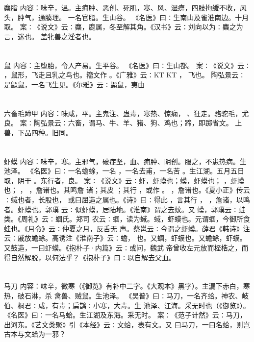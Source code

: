 \documentclass[12pt,UTF8]{ctexbook}
\begin{document}
\chapter{}麋脂
内容：味辛，温。主痈肿、恶创、死肌，寒、风、湿痹，四肢拘缓不收，风头，肿气，通腠理。 
一名官脂。生山谷。 
《名医》曰∶生南山及雀淮南边。十月取。 
案∶《说文》云∶麋，鹿属，冬至解其角。《汉书》云∶刘向以为∶麋之为言，迷也。 
盖牝兽之淫者也。 


\chapter{}鼠
内容：主堕胎，令人产易。生平谷。 
《名医》曰∶生山都。 
案∶《说文》云∶ ，鼠形，飞走且乳之鸟也。籀文作 。《广雅》云∶KT KT ， 
飞也。 
陶弘景云∶是鼯鼠，一名飞生见。《尔雅》云∶鼯鼠，夷由 


\chapter{}六畜毛蹄甲
内容：味咸，平。主鬼注、蛊毒，寒热、惊痫， 、狂走。骆驼毛，尤良。 
案∶陶弘景云∶六畜，谓马、牛、羊、猪、狗、鸡也；蹄，即踯省文。 
上兽，下品四种。旧同。 


\chapter{}虾蟆
内容：味辛，寒。主邪气，破症坚，血、痈肿、阴创。服之，不患热病。生池泽。 
《名医》曰∶一名蟾蜍，一名 ，一名去甫，一名苦 。生江湖。五月五日取，阴干 
。东行者，良。 
案∶《说文》云∶虾，虾蟆也；蟆，虾蟆也； ，虾蟆也； ， ，詹诸也。其鸣詹 
诸；其皮 ；其行 ，或作 。 ，詹诸也。《夏小正》传云∶蜮也者，长股也， 
或曰屈造之属也。《诗》曰∶得此 ，言其行 ， ，詹诸，以鸣者。虾蟆也。郭璞 
云∶似虾蟆，居陆地。《淮南》谓之去蚊。又 蟆，郭璞云∶蛙类。《周礼》云∶蝈氏。郑司 
农云∶蝈，读为蜮。蜮，虾蟆也。元谓蝈，今御所食蛙也。《月令》云∶仲夏之月，反舌无 
声。蔡邕云∶今谓之虾蟆。薛君《韩诗》注云∶戚放蟾蜍。高诱注《淮南子》云∶蟾， 
也。又蝈，虾蟆也。又蟾蜍，虾蟆。又鼓造，一曰虾蟆。《抱朴子·内篇》云∶或问，魏武 
帝曾收左元放而桎梏之，而得自然解脱，以何法乎？《抱朴子》曰∶以自解去父血。 


\chapter{}马刀
内容：味辛，微寒（《御览》有补中二字。《大观本》黑字）。主漏下赤白，寒热，破石淋，杀 
禽兽、贼鼠。生池泽。 
《吴普》曰∶马刀，一名齐蛤。神农、岐伯、桐君∶咸，有毒；扁鹊∶小寒，大毒。生 
池泽、江海。采无时也（《御览》）。 
《名医》曰∶一名马蛤。生江湖及东海。采无时。 
案∶《范子计然》云∶马刀，出河东。《艺文类聚》引《本经》云∶文蛤，表有文。又 
曰马刀，一曰名蛤，则岂古本与文蛤为一邪？ 
\end{document}
